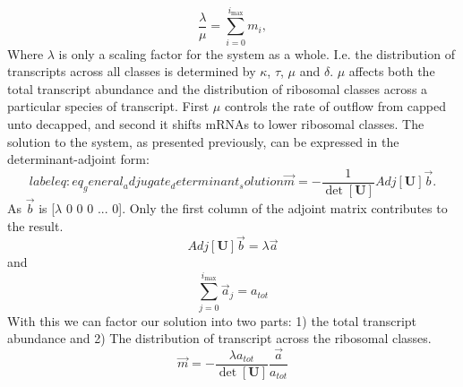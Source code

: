 \documentclass[review]{elsarticle}
\newcommand{\imax}{\ensuremath{i_{\max}}\xspace}
\let\bs\boldsymbol
\begin{document}
	\begin{equation}\label{eq:eq_capped_sum}
		\frac{\lambda}{\mu}=\sum_{i=0}^{\imax}m_{i},
	\end{equation}
Where $\lambda$ is only a scaling factor for the system as a whole. I.e. the distribution of transcripts across all classes is determined by $\kappa$, $\tau$, $\mu$ and $\delta$. %
$\mu$ affects both the total transcript abundance and the distribution of ribosomal classes across a particular species of transcript.
First $\mu$ controls the rate of outflow from capped unto decapped, and second it shifts mRNAs to lower ribosomal classes.
The solution to the system, as presented previously, can be expressed in the determinant-adjoint form:
	\begin{equation*}label{eq:eq_general_adjugate_determinant_solution}
		\vec{m}=-\frac{1}{\det[\bs{U}]}Adj[\bs{U}]\vec{b}.
	\end{equation*}
As $\vec{b}$ is [$\lambda$ 0 0 0 ... 0]. Only the first column of the adjoint matrix contributes to the result. 
	\begin{equation*}
		Adj[\bs{U}]\vec{b} = \lambda\vec{a}
	\end{equation*}	
and
	\begin{equation*}
		\sum_{j=0}^{\imax}\vec{a}_j = a_{tot} 
	\end{equation*}
With this we can factor our solution into two parts: 1) the total transcript abundance and 2) The distribution of transcript across the ribosomal classes.
	\begin{equation*}
		\vec{m}=-\frac{\lambda a_{tot}}{\det[\bs{U}]} \frac{\vec{a}}{a_{tot}} 
	\end{equation*}
\end{document}
